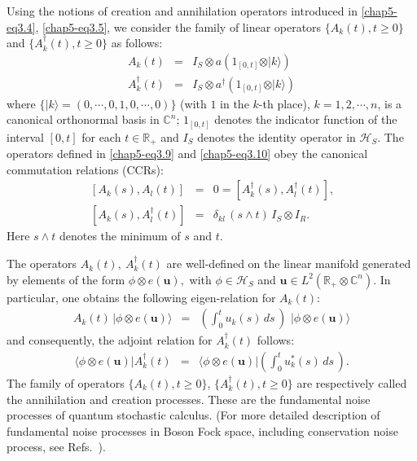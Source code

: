 Using the notions of creation and annihilation operators introduced in \eqref{chap5-eq3.4}, \eqref{chap5-eq3.5}, we consider the family of linear operators  
$\{A_k(t), t\geq 0\}$ and  $\{A^\dag_k(t), t\geq 0\}$ as follows: 
\begin{eqnarray}
A_k(t)&=&I_S \otimes a \left (1_{[0,t]}  \otimes \vert k\rangle \right ) \label{chap5-eq3.9} \\
A^\dagger_k(t) &=& I_S \otimes a^{\dagger} \left (1_{[0,t]}  \otimes \vert k\rangle \right )  \label{chap5-eq3.10} 
\end{eqnarray}
where $\{\vert k\rangle = (0, \cdots, 0, 1,0,\cdots,0)\}$ (with $1$ in the $k$-th place), $k=1,2, \cdots, n$, is  a canonical orthonormal basis in $\mathbb{C}^n $;   $1_{[0,t]}$ denotes the indicator function of the interval $[0,t]$ for each $t\in\mathbb{R}_+$ and $I_S$  denotes the identity operator in $\mathcal{H}_S$. The operators defined in \eqref{chap5-eq3.9} and \eqref{chap5-eq3.10} obey the canonical commutation relations (CCRs): 
\begin{eqnarray}
\, [A_k(s),A_l(t)]&=&0=[A^\dag_k(s),A^\dag_l(t)], \label{chap5-eq3.11} \\   
\, [A_k (s),A^\dag_l(t)]&=&\delta_{kl}\, (s \wedge t)\, I_S\otimes I_R. \label{chap5-eq3.12}
\end{eqnarray}
Here $s\wedge t$ denotes the minimum of $s$ and $t$. 

The operators $A_k(t),\ A^\dag_k(t)$ are well-defined on the linear manifold generated by elements of the form $\phi 
\otimes e (\mathbf{u}),$ with $\phi \in \mathcal{H}_S$ and $\mathbf{u} \in L^2(\mathbb{R}_+\otimes \mathbb{C}^n)$. In particular, one obtains the following eigen-relation for $A_k(t)$: 
\begin{eqnarray} 
A_k(t)\,  \vert \phi \otimes e(\mathbf{u})\rangle &=& \left(\int_{0}^{t} u_k(s)\, ds\, \right)\, \,\vert\phi \otimes e(\mathbf{u})\rangle \label{chap5-eq3.13}
\end{eqnarray} 
and consequently, the adjoint relation for $A^\dag_k(t)$ follows: 
\begin{eqnarray} 
\langle \phi \otimes e(\mathbf{u})  \vert A^\dag_k(t) &=& \langle \phi \otimes e(\mathbf{u})  \vert \left(\int_{0}^{t} u^*_k(s)\, ds\, \right). \label{chap5-eq3.14}
\end{eqnarray}
The family of operators $\{A_k(t), t\geq 0\}$, $\{A^\dag_k(t), t\geq 0\}$ are respectively called the annihilation and creation processes. These are the fundamental noise processes of quantum stochastic calculus. (For more detailed description of fundamental noise processes in Boson Fock space, including conservation noise process, see Refs.~\cite{key7, key8}).  

